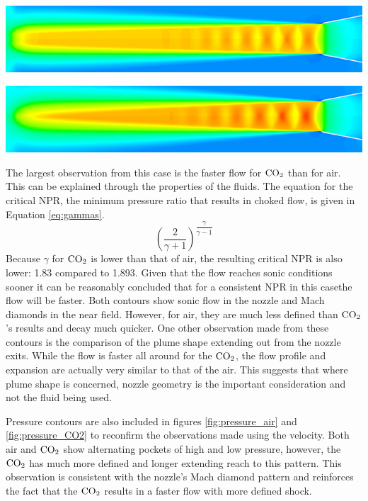 \documentclass[12pt]{article} %
\begin{document}
\begin{center}
    \includegraphics[width=5.5in]{Mach_Air.png}
    \label{fig:mach_air}
\end{center}

\begin{center}
    \includegraphics[width=5.5in]{Mach_CO2.png}
    \label{fig:mach_CO2}
\end{center}

The largest observation from this case is the faster flow for $\textnormal{CO}_2$ than for air. This can be explained through the properties of the fluids. The equation for the critical NPR, the minimum pressure ratio that results in choked flow, is given in Equation \ref{eq:gammas}\cite{engineering_toolbox}.
\begin{equation}\label{eq:gammas}
\left(\dfrac{2}{\gamma+1}\right)^{\dfrac{\gamma}{\gamma-1}}
\end{equation}
Because $\gamma$ for $\textnormal{CO}_2$ is lower than that of air, the resulting critical NPR is also lower: 1.83 compared to 1.893. Given that the flow reaches sonic conditions sooner it can be reasonably concluded that for a consistent NPR in this case\textemdash the flow will be faster. Both contours show sonic flow in the nozzle and Mach diamonds in the near field. However, for air, they are much less defined than $\textnormal{CO}_2$’s results and decay much quicker.  One other observation made from these contours is the comparison of the plume shape extending out from the nozzle exits. While the flow is faster all around for the $\textnormal{CO}_2$, the flow profile and expansion are actually very similar to that of the air. This suggests that where plume shape is concerned, nozzle geometry is the important consideration and not the fluid being used.

Pressure contours are also included in figures \ref{fig:pressure_air} and \ref{fig:pressure_CO2} to reconfirm the observations made using the velocity. Both air and $\textnormal{CO}_2$ show alternating pockets of high and low pressure, however, the $\textnormal{CO}_2$ has much more defined and longer extending reach to this pattern. This observation is consistent with the nozzle’s Mach diamond pattern and reinforces the fact that the  $\textnormal{CO}_2$ results in a faster flow with more defined shock.
\end{document}
